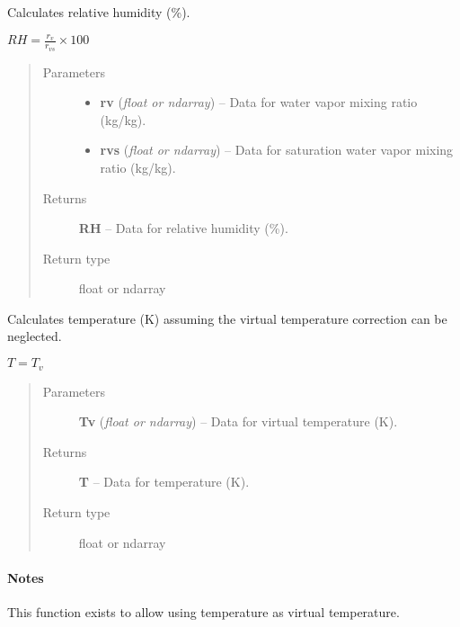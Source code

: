 \documentclass[letterpaper,10pt,english]{sphinxmanual}
\begin{document}
\begin{fulllineitems}
\label{atmos:atmos.equations.RH_from_rv_rvs}
Calculates relative humidity (\%).

\(RH = \frac{r_v}{r_{vs}} \times 100\)
\begin{quote}\begin{description}
\item[{Parameters}] \leavevmode\begin{itemize}
\item {} 
\textbf{rv} (\emph{float or ndarray}) -- Data for water vapor mixing ratio (kg/kg).

\item {} 
\textbf{rvs} (\emph{float or ndarray}) -- Data for saturation water vapor mixing ratio (kg/kg).

\end{itemize}

\item[{Returns}] \leavevmode
\textbf{RH} --
Data for relative humidity (\%).

\item[{Return type}] \leavevmode
float or ndarray

\end{description}\end{quote}

\end{fulllineitems}


\begin{fulllineitems}
\label{atmos:atmos.equations.T_from_Tv_assuming_Tv_equals_T}
Calculates temperature (K) assuming the virtual temperature correction can be
neglected.

\(T = T_v\)
\begin{quote}\begin{description}
\item[{Parameters}] \leavevmode
\textbf{Tv} (\emph{float or ndarray}) -- Data for virtual temperature (K).

\item[{Returns}] \leavevmode
\textbf{T} --
Data for temperature (K).

\item[{Return type}] \leavevmode
float or ndarray

\end{description}\end{quote}
\paragraph{Notes}

This function exists to allow using temperature as virtual temperature.

\end{fulllineitems}
\end{document}
